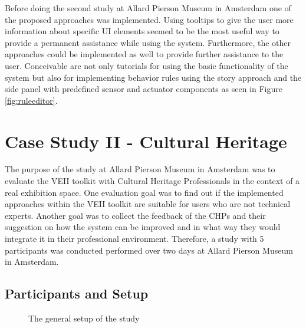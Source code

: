 Before doing the second study at Allard Pierson Museum in Amsterdam one of the proposed approaches was implemented. Using tooltips to give the user more information about specific UI elements seemed to be the most useful way to provide a permanent assistance while using the system. Furthermore, the other approaches could be implemented as well to provide further assistance to the user. Conceivable are not only tutorials for using the basic functionality of the system but also for implementing behavior rules using the story approach and the side panel with predefined sensor and actuator components as seen in Figure \ref{fig:ruleeditor}.

\section{Case Study II - Cultural Heritage}
The purpose of the study at Allard Pierson Museum in Amsterdam was to evaluate the VEII toolkit with Cultural Heritage Professionals in the context of a real exhibition space. One evaluation goal was to find out if the implemented approaches within the VEII toolkit are suitable for users who are not technical experts. Another goal was to collect the feedback of the CHPs and their suggestion on how the system can be improved and in what way they would integrate it in their professional environment. Therefore, a study with 5 participants was conducted performed over two days at Allard Pierson Museum in Amsterdam.

\subsection{Participants and Setup}

\begin{figure}
\hfill
{}\hfill
{}\hfill
\caption{The general setup of the study}
\end{figure}

